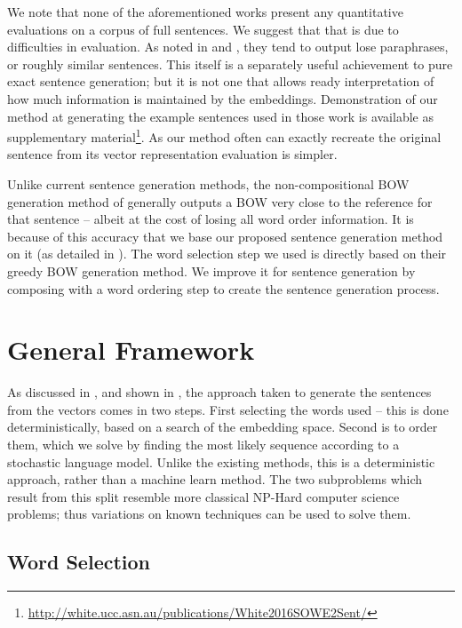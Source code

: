 {We note that none of the aforementioned works present any quantitative evaluations on a corpus of full sentences. We suggest that that is due to difficulties in evaluation. As noted in \textcite{iyyer2014generating} and \textcite{Bowman2015SmoothGeneration}, they tend to output lose paraphrases, or roughly similar sentences. This itself is a separately useful achievement to pure exact sentence generation; but it is not one that allows ready interpretation of how much information is maintained by the embeddings. Demonstration of our method at generating the example sentences used in those work is available as supplementary material\footnote{\url{http://white.ucc.asn.au/publications/White2016SOWE2Sent/}}. As our method often can exactly recreate the original sentence from its vector representation evaluation is simpler.

Unlike current sentence generation methods, the non-compositional BOW generation method of \textcite{White2015BOWgen} generally outputs a BOW very close to the reference for that sentence -- albeit at the cost of losing all word order information. It is because of this accuracy that we base our proposed sentence generation method on it (as detailed in ). The word selection step we used is directly based on their greedy BOW generation method. We improve it for sentence generation by composing with a word ordering step to create the sentence generation process.



\section{General Framework}\label{framework}
As discussed in , and shown in , the approach taken to generate the sentences from the vectors comes in two steps. First selecting the words used -- this is done deterministically, based on a search of the embedding space. Second is to order them, which we solve by finding the most likely sequence according to a stochastic language model. Unlike the existing methods, this is a deterministic approach, rather than a machine learn method. The two subproblems which result from this split resemble more classical NP-Hard computer science problems; thus variations on known techniques can be used to solve them.

\subsection{Word Selection} \label{selection}
\renewcommand{\c}{\tilde{c}}
\newcommand{\s}{\tilde{s}}
\newcommand{\x}{\tilde{x}}
\renewcommand{\t}{\tilde{t}}
\newcommand{\N}{\mathbb{N}}
\newcommand{\R}{\mathbb{R}}
\newcommand{\V}{\mathcal{V}}
\def\B{\mathcal{B}}




}
